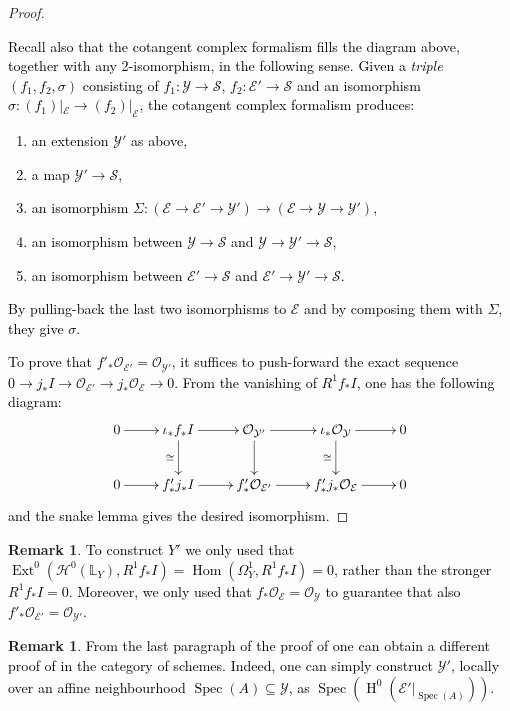 \documentclass{amsart}
\newcommand{\bL}{\mathbb{L}}
\newcommand{\oH}{\operatorname{H}}
\newcommand{\cE}{\mathcal{E}}
\newcommand{\cH}{\mathcal{H}}
\newcommand{\cO}{\mathcal{O}}
\newcommand{\cS}{\mathcal{S}}
\newcommand{\cY}{\mathcal{Y}}
\newcommand{\E}{\operatorname{Ext}}
\newcommand{\spec}{\operatorname{Spec}}
\theoremstyle{definition}
\newtheorem{Remark}[theorem]{Remark}
\begin{document}
\begin{proof}
     \textcolor{black}{Recall also that the cotangent complex formalism fills the diagram above, together with any 2-isomorphism, in the following sense. Given a \textit{triple} $(f_1, f_2, \sigma)$ consisting of $f_1:\cY\to \cS$, $f_2:\cE'\to \cS$ and an isomorphism $\sigma:(f_1)|_\cE\to (f_2)|_\cE$, the cotangent complex formalism produces:
     \begin{enumerate}
         \item an extension $\cY'$ as above,
         \item a map $\cY'\to \cS$,
         \item an isomorphism $\Sigma:(\cE\to \cE'\to \cY')\to (\cE\to \cY\to \cY')$,
         \item an isomorphism between $\cY\to \cS$ and $\cY\to \cY'\to\cS$,
         \item an isomorphism between $\cE'\to \cS$ and $\cE'\to \cY'\to \cS$.
     \end{enumerate} By pulling-back the last two isomorphisms to $\cE$ and by composing them with $\Sigma$, they give $\sigma$. }
     
     \textcolor{black}{To prove that $f'_*\cO_{\cE'}=\cO_{\cY'}$, it suffices to push-forward the exact sequence $0\to j_*I\to \cO_{\cE'}\to j_*\cO_{\cE}\to 0$. From the vanishing of $R^1f_*I$, one has the following diagram:$$\xymatrix{0\ar[r] & \iota_*f_*I\ar[r] \ar[d]_\cong &\cO_{\cY'}\ar[r] \ar[d] & \iota_*\cO_{\cY}\ar[r] \ar[d]_\cong & 0 \\ 0\ar[r] & f'_*j_*I\ar[r]  &f'_* \cO_{\cE'}\ar[r] & f'_*j_*\cO_{\cE}\ar[r]  & 0}$$
     and the snake lemma gives the desired isomorphism.}
\end{proof}
\begin{Remark}\label{remark_contangent_complex_argument}
    \textcolor{black}{To construct $Y'$ we only used that $\E^0(\cH^0(\bL_{Y}),R^1f_*I) = \operatorname{Hom}(\Omega^1_{Y},R^1f_*I)=0$, rather than the stronger $R^1f_*I=0$. Moreover, we only used that $f_*\cO_\cE = \cO_\cY$ to guarantee that also $f'_*\cO_{\cE'} = \cO_{\cY'}$.}
\end{Remark}
\begin{Remark}
    \textcolor{black}{From the last paragraph of the proof of  one can obtain a different proof of  in the category of schemes. Indeed, one can simply construct $\cY'$, locally over an affine neighbourhood $\spec(A)\subseteq \cY$, as $\spec(\oH^0(\cE'|_{\spec(A)}))$.}
\end{Remark}
\end{document}
